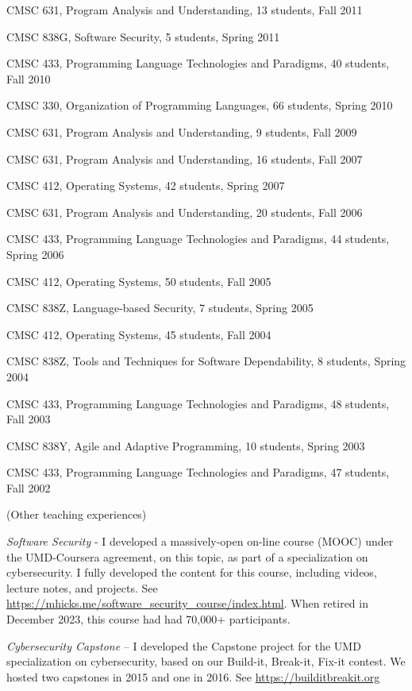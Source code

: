 \documentclass[11pt]{article}
\begin{document}
\begin{description}
    \item CMSC 631, Program Analysis and Understanding, 13 students, Fall 2011
    \item CMSC 838G, Software Security, 5 students, Spring 2011
    \item CMSC 433, Programming Language Technologies and Paradigms, 40 students, Fall 2010
    \item CMSC 330, Organization of Programming Languages, 66 students, Spring 2010
    \item CMSC 631, Program Analysis and Understanding, 9 students, Fall 2009
    \item CMSC 631, Program Analysis and Understanding, 16 students, Fall 2007
    \item CMSC 412, Operating Systems, 42 students, Spring 2007
    \item CMSC 631, Program Analysis and Understanding, 20 students, Fall 2006
    \item CMSC 433, Programming Language Technologies and Paradigms, 44 students, Spring 2006
    \item CMSC 412, Operating Systems, 50 students, Fall 2005
    \item CMSC 838Z, Language-based Security, 7 students, Spring 2005
    \item CMSC 412, Operating Systems, 45 students, Fall 2004
    \item CMSC 838Z, Tools and Techniques for Software Dependability, 8 students, Spring 2004
    \item CMSC 433, Programming Language Technologies and Paradigms, 48 students, Fall 2003
    \item CMSC 838Y, Agile and Adaptive Programming, 10 students, Spring 2003
    \item CMSC 433, Programming Language Technologies and Paradigms, 47 students, Fall 2002
    \item (Other teaching experiences)
    \item \textit{Software Security} - I developed a massively-open
    on-line course (MOOC) under the UMD-Coursera agreement, on this
    topic, as part of a specialization on cybersecurity. I fully
    developed the content for this course, including videos, lecture
    notes, and projects. See
    \url{https://mhicks.me/software_security_course/index.html}. When
    retired in December 2023, this course had had 70,000+ participants.  
\item \textit{Cybersecurity Capstone} – I developed the Capstone
  project for the UMD specialization on cybersecurity, based on our
  Build-it, Break-it, Fix-it contest. We hosted two capstones in 2015
  and one in 2016. See \url{https://builditbreakit.org}
      
\end{description}
\end{document}

